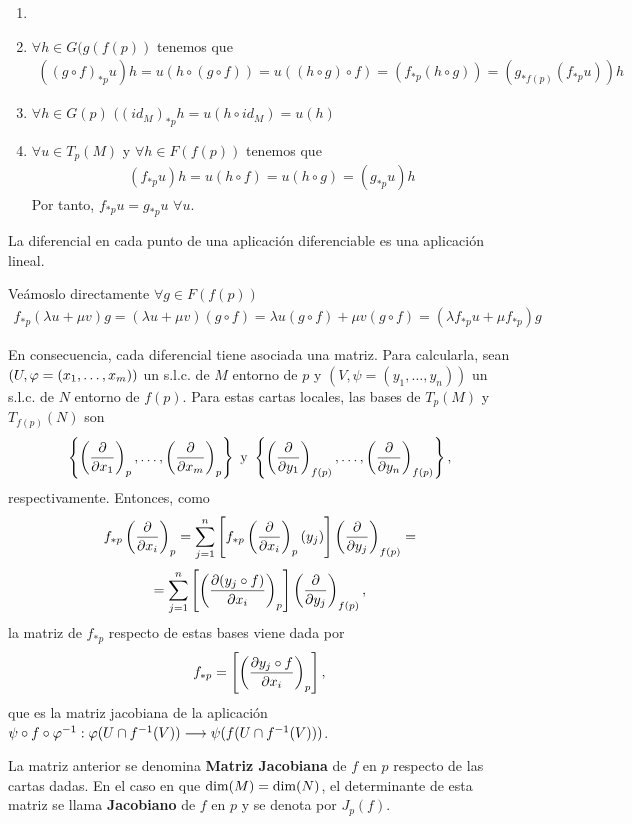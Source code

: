 \documentclass[Cursovd_portada.tex]{subfiles}
\begin{document}
\begin{dem}
\begin{enumerate}
\item[]
\item $\forall h \in G(g(f(p))$ tenemos que 
\begin{gather*}
((g\circ f)_{\ast p}u)h = u(h\circ(g \circ f)) = u ((h\circ g) \circ f) = (f_{\ast p}(h \circ g)) = (g_{\ast f(p)}(f_{\ast p} u))h
\end{gather*}
\item $\forall h \in G(p)$ $((id_M)_{\ast p}h = u(h \circ id_M) = u(h)$
\item $\forall u \in T_p(M)$ y $\forall h\in F(f(p))$ tenemos que 
\begin{gather*}
(f_{\ast p}u)h = u(h\circ f)=u(h \circ g) = (g_{\ast p} u)h
\end{gather*}
Por tanto, $f_{\ast p}u=g_{\ast p}u$ $\forall u$.
\end{enumerate}
\end{dem}
\begin{prop}
La diferencial en cada punto de una aplicación diferenciable es una aplicación lineal.
\end{prop}
\begin{dem}
Veámoslo directamente $\forall g\in F(f(p))$
\begin{gather*}
 f_{\ast p}(\lambda u+\mu v)g = (\lambda u+\mu v)(g\circ f)= \lambda u(g \circ f)+\mu v(g \circ f) = (\lambda f_{\ast p} u + \mu f_{\ast p})g
\end{gather*}
\end{dem}
En consecuencia, cada diferencial tiene asociada una matriz. Para calcularla, sean $(U,\varphi=(x_1,\dots ,x_m))$ un
s.l.c. de $M$ entorno de $p$ y $(V,\psi=(y_1,\dots ,y_n))$ un s.l.c. de $N$ entorno de $f(p)$. Para estas cartas
locales, las bases de $T_p(M)$ y $T_{f(p)}(N)$ son
$$\left\{\left(\displaystyle{\frac{\partial}{\partial x_1}}\right)_p,\dots ,\left(\displaystyle{\frac{\partial}{\partial x_m}}\right)_p\right\}\mbox{ }{\rm y}\mbox{
}\left\{\left(\displaystyle{\frac{\partial}{\partial y_1}}\right)_{f(p)},\dots ,\left(\displaystyle{\frac{\partial}{\partial y_n}}\right)_{f(p)}\right\},$$ respectivamente. Entonces,
como
$$f_{*p}\left(\displaystyle{\frac{\partial}{\partial x_i}}\right)_p=\sum_{j=1}^n\left[f_{*p}\left(\displaystyle{\frac{\partial}{\partial x_i}}\right)_p(y_j)\right]\left(\displaystyle{\frac{\partial}{\partial y_j}}
\right)_{f(p)}=$$ $$=\sum_{j=1}^n\left[\left(\displaystyle{\frac{\partial (y_j\circ f)}{\partial x_i}}\right)_p\right]\left(\displaystyle{\frac{\partial}{\partial y_j}}
\right)_{f(p)},$$ la matriz de $f_{*p}$ respecto de estas bases viene dada por
$$f_{*p}=\left[\left(\displaystyle{\frac{\partial y_j\circ f}{\partial x_i}}\right)_p\right],$$
que es la matriz jacobiana de la aplicación $\psi\circ f\circ\varphi^{-1}:\varphi(U\cap f^{-1}(V))\longrightarrow\psi(f(U\cap
f^{-1}(V)))$.
\begin{defi}
La matriz anterior se denomina {\bf Matriz Jacobiana} de $f$ en $p$ respecto de las cartas dadas. En el caso en
que ${\rm dim}(M)={\rm dim}(N)$, el determinante de esta matriz se llama {\bf Jacobiano} de $f$ en $p$ y se denota
por $J_p(f)$.
\end{defi}
\end{document}
